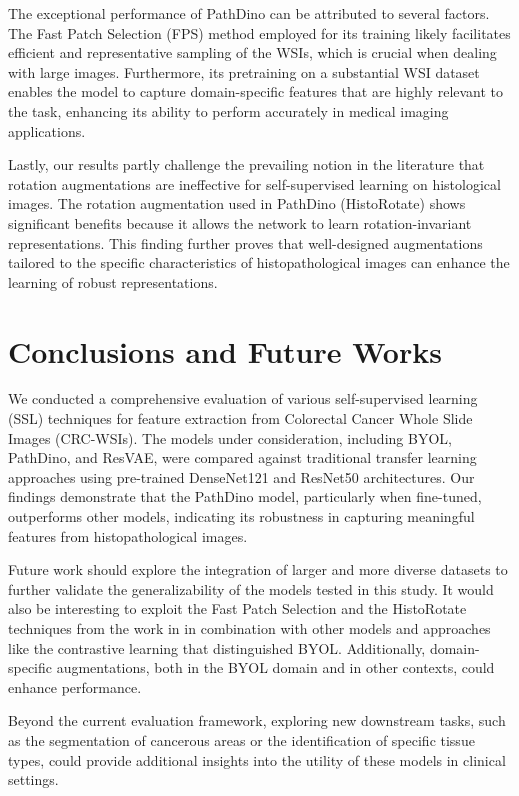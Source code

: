 \documentclass[peerreview]{IEEEtran}
\begin{document}
The exceptional performance of PathDino can be attributed to several factors. The Fast Patch Selection (FPS) method employed for its training likely facilitates efficient and representative sampling of the WSIs, which is crucial when dealing with large images. Furthermore, its pretraining on a substantial WSI dataset enables the model to capture domain-specific features that are highly relevant to the task, enhancing its ability to perform accurately in medical imaging applications.

Lastly, our results partly challenge the prevailing notion in the literature that rotation augmentations are ineffective for self-supervised learning on histological images. The rotation augmentation used in PathDino (HistoRotate) shows significant benefits because it allows the network to learn rotation-invariant representations. This finding further proves that well-designed augmentations tailored to the specific characteristics of histopathological images can enhance the learning of robust representations.

\section{Conclusions and Future Works}
\label{sec:conclusions}
We conducted a comprehensive evaluation of various self-supervised learning (SSL) techniques for feature extraction from Colorectal Cancer Whole Slide Images (CRC-WSIs). The models under consideration, including BYOL, PathDino, and ResVAE, were compared against traditional transfer learning approaches using pre-trained DenseNet121 and ResNet50 architectures. Our findings demonstrate that the PathDino model, particularly when fine-tuned, outperforms other models, indicating its robustness in capturing meaningful features from histopathological images. 

Future work should explore the integration of larger and more diverse datasets to further validate the generalizability of the models tested in this study. It would also be interesting to exploit the Fast Patch Selection and the HistoRotate techniques from the work in \cite{pathdino} in combination with other models and approaches like the contrastive learning that distinguished BYOL. Additionally, domain-specific augmentations, both in the BYOL domain and in other contexts, could enhance performance.

Beyond the current evaluation framework, exploring new downstream tasks, such as the segmentation of cancerous areas or the identification of specific tissue types, could provide additional insights into the utility of these models in clinical settings.



\end{document}
